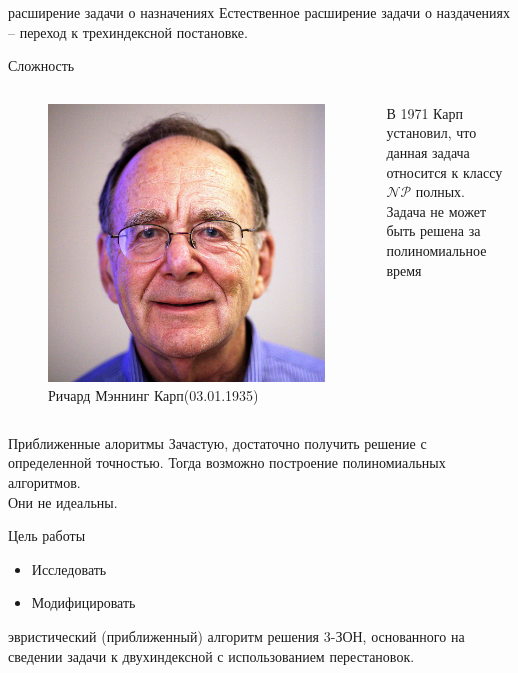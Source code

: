 \documentclass[12pt]{beamer}
\begin{document}
\begin{frame}{расширение задачи о назначениях }
Естественное расширение задачи о наздачениях -- переход к трехиндексной постановке.
\end{frame}

\begin{frame}{Сложность}
\begin{columns}
\begin{figure}
\includegraphics[scale=0.15]{karp.jpg}
\caption{Ричард Мэннинг Карп(03.01.1935)}
\end{figure}
В 1971 Карп установил, что данная задача относится к классу $\mathcal{NP}$ полных. \\
Задача не может быть решена за полиномиальное время
\end{columns}
\end{frame}

\begin{frame}{Приближенные алоритмы}
Зачастую, достаточно получить решение с определенной точностью. 
Тогда возможно построение полиномиальных алгоритмов. \\
Они не идеальны. 
\end{frame}

\begin{frame}{Цель работы}
\begin{itemize}
\item Исследовать
\item Модифицировать
\end{itemize}
эвристический (приближенный) алгоритм решения 3-ЗОН, основанного на сведении 
задачи к двухиндексной с использованием перестановок. 
\end{frame}
\end{document}
